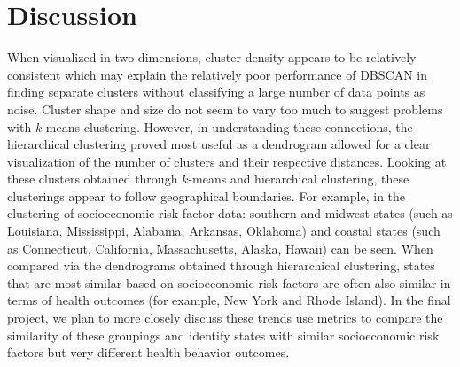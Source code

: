 \documentclass{article}
\begin{document}
\section{Discussion}
\label{Discussion}
When visualized in two dimensions, cluster density appears to be relatively consistent which may explain the relatively poor performance of DBSCAN in finding separate clusters without classifying a large number of data points as noise. Cluster shape and size do not seem to vary too much to suggest problems with $k$-means clustering. However, in understanding these connections, the hierarchical clustering proved most useful as a dendrogram allowed for a clear visualization of the number of clusters and their respective distances. Looking at these clusters obtained through $k$-means and hierarchical clustering, these clusterings appear to follow geographical boundaries. For example, in the clustering of socioeconomic risk factor data: southern and midwest states (such as Louisiana, Mississippi, Alabama, Arkansas, Oklahoma) and coastal states (such as Connecticut, California, Massachusetts, Alaska, Hawaii) can be seen. When compared via the dendrograms obtained through hierarchical clustering, states that are most similar based on socioeconomic risk factors are often also similar in terms of health outcomes (for example, New York and Rhode Island). In the final project, we plan to more closely discuss these trends use metrics to compare the similarity of these groupings and identify states with similar socioeconomic risk factors but very different health behavior outcomes.



\end{document}
